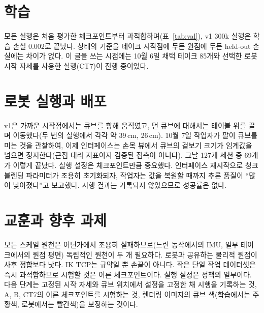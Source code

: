 \documentclass[conference,10pt]{IEEEtran}
\begin{document}
\section{학습}
\begin{table}[t]
\centering\footnotesize\setlength{\tabcolsep}{4pt}
\caption{체크포인트별 held-out 손실(마스킹된 MSE). 괄호 안은 학습 부분집합 손실.}
\label{tab:val}
\end{table}
모든 실행은 처음 평가한 체크포인트부터 과적합하며(표~\ref{tab:val}), v1 300k 실행은 학습 손실 0.002로 끝났다. 상태의
기준을 테이크 시작점에 두든 원점에 두든 held-out 손실에는 차이가 없다. 이 글을 쓰는 시점에는 10월 6일 채택 테이크 85개와
선택한 로봇 시작 자세를 사용한 실행(CT7)이 진행 중이었다.

\section{로봇 실행과 배포}
v1은 가까운 시작점에서는 큐브를 향해 움직였고, 먼 큐브에 대해서는 테이블 위를 끌며 이동했다(두 번의 실행에서 각각 약 39\,cm,
26\,cm). 10월 7일 작업자가 팔이 큐브를 미는 것을 관찰하여, 이제 인터페이스는 손목 뷰에서 큐브의 겉보기 크기가 임계값을
넘으면 정지한다(근접 대리 지표이지 검증된 접촉이 아니다). 그날 127개 세션 중 69개가 이렇게 끝났다. 실행 설정은
체크포인트만큼 중요했다. 인터페이스 재시작으로 청크 블렌딩 파라미터가 조용히 초기화되자, 작업자는 값을 복원할 때까지
추론 품질이 “많이 낮아졌다”고 보고했다. 시행 결과는 기록되지 않았으므로 성공률은 없다.

\section{교훈과 향후 과제}
모든 스케일 원천은 어딘가에서 조용히 실패하므로(느린 동작에서의 IMU, 일부 테이크에서의 원점 평면) 독립적인 원천이 두 개
필요하다. 로봇과 공유하는 물리적 원점이 사후 정합보다 낫다. IK TCP는 규약일 뿐 손끝이 아니다. 작은 단일 작업 데이터셋은
즉시 과적합하므로 시험할 것은 이른 체크포인트이다. 실행 설정은 정책의 일부이다. 다음 단계는 고정된 시작 자세와 큐브
위치에서 설정을 고정한 채 시행을 기록하는 것, A, B, CT7의 이른 체크포인트를 시험하는 것, 렌더링 이미지의 큐브 색(학습에서는
주황색, 로봇에서는 빨간색)을 보정하는 것이다.
\end{document}
